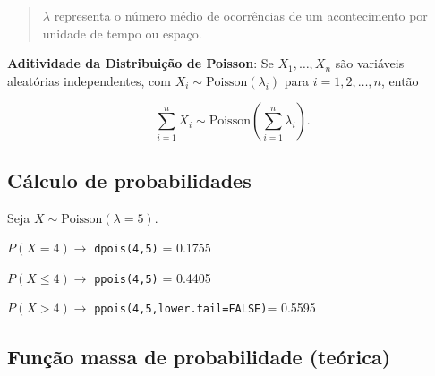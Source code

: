 \documentclass[
]{book}
\begin{document}
\begin{quote}
\(\lambda\) representa o número médio de ocorrências de um acontecimento por unidade de tempo ou espaço.
\end{quote}

\textbf{Aditividade da Distribuição de Poisson}: Se \(X_1, \dots, X_n\) são variáveis aleatórias independentes, com \(X_i \sim \text{Poisson}(\lambda_i)\) para \(i = 1, 2, \dots, n\), então

\[
\sum_{i=1}^n X_i \sim \text{Poisson}\left( \sum_{i=1}^n \lambda_i \right).
\]

\subsection{Cálculo de probabilidades}\label{cuxe1lculo-de-probabilidades-3}

Seja \(X\sim\text{Poisson}(\lambda=5)\).

\(P(X =4) \to\) \texttt{dpois(4,5)} = 0.1755

\noindent \(P(X\leq 4) \to\) \texttt{ppois(4,5)} = 0.4405

\noindent \(P(X > 4)\to\) \texttt{ppois(4,5,lower.tail=FALSE)}= 0.5595

\subsection{Função massa de probabilidade (teórica)}\label{funuxe7uxe3o-massa-de-probabilidade-teuxf3rica-1}
\end{document}
